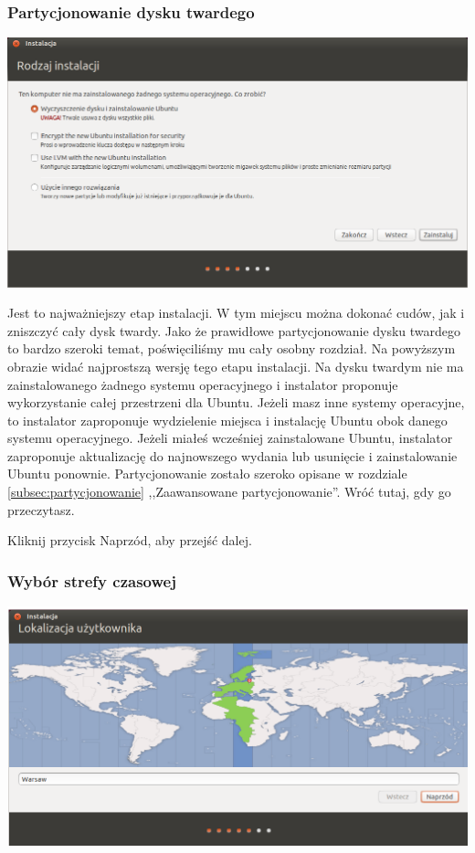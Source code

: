 \subsubsection{Partycjonowanie dysku twardego}
\begin{center}
        \includegraphics[width=\linewidth]{images/instalator_partycjonowanie_proste.png}
\end{center}

Jest to najważniejszy etap instalacji. W tym miejscu można dokonać cudów, jak i zniszczyć cały dysk twardy. Jako że prawidłowe partycjonowanie dysku twardego to bardzo szeroki temat, poświęciliśmy mu cały osobny rozdział. Na powyższym obrazie widać najprostszą wersję tego etapu instalacji. Na dysku twardym nie ma zainstalowanego żadnego systemu operacyjnego i instalator proponuje wykorzystanie całej przestrzeni dla Ubuntu. Jeżeli masz inne systemy operacyjne, to instalator zaproponuje wydzielenie miejsca i instalację Ubuntu obok danego systemu operacyjnego. Jeżeli miałeś wcześniej zainstalowane Ubuntu, instalator zaproponuje aktualizację do najnowszego wydania lub usunięcie i zainstalowanie Ubuntu ponownie.
Partycjonowanie zostało szeroko opisane w rozdziale \ref{subsec:partycjonowanie} ,,Zaawansowane partycjonowanie''. Wróć tutaj, gdy go przeczytasz.
\begin{flushright}
Kliknij przycisk \textcolor{ubuntu_orange}{Naprzód}, aby przejść dalej.
\end{flushright}
\clearpage
\subsubsection{Wybór strefy czasowej}
\label{instalator_strefa_czasowa}
\begin{center}
        \includegraphics[width=\linewidth]{images/instalator_czas.png}
\end{center}

